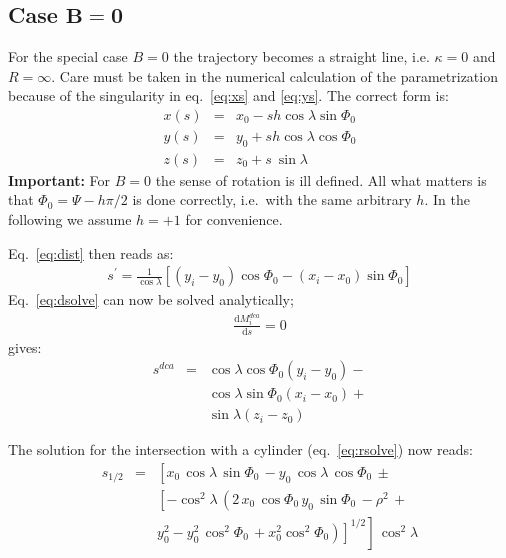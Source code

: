 \documentclass[twoside]{article}
\begin{document}
\subsection{Case $\mathbf{B = 0}$}

For the special case $B = 0$ the trajectory becomes a straight line,
i.e. $\kappa = 0$ and $R = \infty$.  Care must be taken in the numerical
calculation of the parametrization because of the singularity in
eq.~\ref{eq:xs} and \ref{eq:ys}. The correct form is:
\begin{eqnarray}
    x(s) & = & x_0 - s h \cos\lambda \sin\Phi_0 \\
    y(s) & = & y_0 + s h \cos\lambda \cos\Phi_0 \\
    z(s) & = & z_0 + s\ \sin\lambda
\end{eqnarray}
\textbf{Important:} For $B = 0$ the sense of rotation is ill defined. All what matters
is that $\Phi_0 = \Psi - h \pi/2$ is done correctly, i.e.~with the same arbitrary $h$. 
In the following we assume $h = +1$ for convenience.

Eq.~\ref{eq:dist} then reads as:
\begin{eqnarray}
  s^\prime = \frac{1}{\cos\lambda} \left[(y_i-y_0)\cos\Phi_0 - (x_i-x_0) \sin\Phi_0 \right]
\end{eqnarray}
Eq.~\ref{eq:dsolve} can now be solved analytically;
\begin{eqnarray}
\frac{\mathrm{d}M_i^{dca}}{\mathrm{d}s} = 0
\end{eqnarray}
gives:
\begin{eqnarray}
s^{dca}   & = & \cos\lambda \cos\Phi_0 (y_i-y_0) - \nonumber \\
          &   & \cos\lambda \sin\Phi_0 (x_i-x_0) + \nonumber \\
          &   & \sin\lambda (z_i-z_0)
\end{eqnarray}

The solution for the intersection with a cylinder (eq.~\ref{eq:rsolve}) now reads:
\begin{eqnarray}
s_{1/2}   & = & \left[x_0\,\cos\lambda\,\sin\Phi_0\,- y_0\,\cos\lambda\,\cos\Phi_0 \, \pm  \right. \\
   & & \left.
\left[-\cos^2\lambda\,\left(2\,x_0\,\cos\Phi_0\, y_0
\,\sin\Phi_0\,-\rho^2\, + \right. \right. \right.  \\
& & \left. \left.  \left.
y_0^2-y_0^2 \,\cos^2\Phi_0\,
+ x_0^2  \cos^2\Phi_0 \right )\right]^{1/2} \right]\, \cos^2\lambda 
\end{eqnarray}
\end{document}
